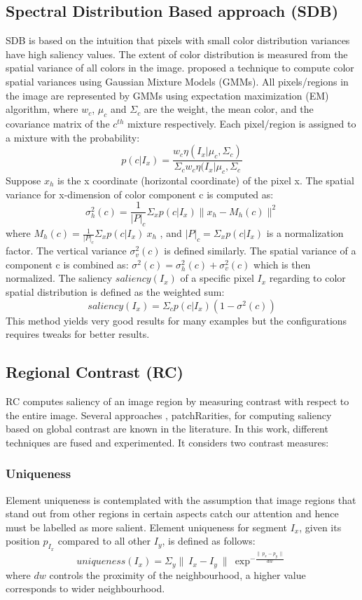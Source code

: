 \subsection{Spectral Distribution Based approach (SDB)} 
SDB is based on the intuition that pixels with small color distribution variances have high saliency values.  The extent of color distribution is measured from the spatial variance of all colors in the image.  \cite{spectralSal} proposed a technique to compute color spatial variances using Gaussian Mixture Models (GMMs).  All pixels/regions in the image are represented by GMMs using expectation maximization (EM) algorithm, where $w_{c}$, $\mu_{c}$ and $\Sigma_{c}$ are the weight, the mean color, and the covariance matrix of the $c^{th}$ mixture respectively. Each pixel/region is assigned to a mixture with the probability:
$$p(c | I_{x}) = \frac{w_{c}\eta(I_{x}| \mu_{c},\Sigma_{c})}{\Sigma_{c}w_{c}\eta(I_{x}| \mu_{c},\Sigma_{c}} $$
Suppose $x_{h}$ is the x coordinate (horizontal coordinate) of the pixel x. The spatial variance for x-dimension of color component c is computed as:
$$\sigma_{h}^{2}(c) = \frac{1}{|P|_{c}}\Sigma_{x}	p(c | I_{x}) \parallel x_{h} -M_{h}(c) \parallel^{2}$$
where $M_{h}(c) = \frac{1}{|P|_{c}}\Sigma_{x}p(c|I_{x})~x_h$ , and $|P|_{c} = \Sigma_{x}p(c | I_{x})$ is a normalization factor.  The vertical variance $\sigma_{v}^{2}(c)$ is defined similarly.  The spatial variance of a component c is combined as: $\sigma^{2}(c) = \sigma_{h}^{2}(c) + \sigma_{v}^{2}(c)$ which is then normalized.
The saliency $saliency(I_{x})$ of a specific pixel $I_{x}$ regarding to color spatial distribution is defined as the weighted sum:
$$saliency(I_{x}) = \Sigma_{c}p(c | I_{x})(1-\sigma^{2}(c))$$
This method yields very good results for many examples but the configurations requires tweaks for better results.

\subsection{Regional Contrast (RC)}
RC computes saliency of an image region by measuring contrast with respect to the entire image. Several approaches  \citep{globContrast}, {patchRarities}, \citep{salFilters} for computing saliency based on global contrast are known in the literature.  In this work, different techniques are fused and experimented.  It considers two contrast measures:
\subsubsection{Uniqueness}
Element uniqueness is contemplated with the assumption that image regions that stand out from other regions in certain aspects catch our attention and hence must be labelled as more salient.  Element uniqueness for segment $I_{x}$, given its position $p_{I_{x}}$ compared to all other $I_{y}$, is defined as follows:
$$uniqueness(I_{x}) = \Sigma_{y} \parallel~I_{x} -I_{y}~\parallel~\exp^{-\frac{\parallel~p_{x} - p_{y}~\parallel}{dw}}$$
where $dw$ controls the proximity of the neighbourhood, a higher value corresponds to wider neighbourhood.
